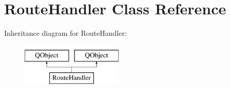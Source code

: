 \hypertarget{class_route_handler}{}\section{Route\+Handler Class Reference}
\label{class_route_handler}
Inheritance diagram for Route\+Handler\+:\begin{figure}[H]
\begin{center}
\leavevmode
\includegraphics[height=2.000000cm]{class_route_handler}
\end{center}
\end{figure}
